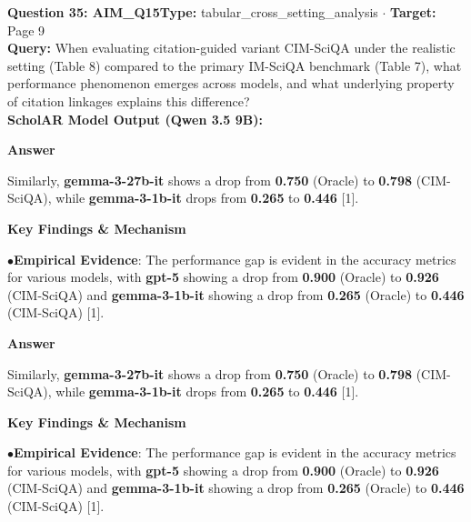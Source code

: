 \documentclass[10pt,a4paper]{article}
\begin{document}
\begin{tcolorbox}[questionbox]
{\noindent\bfseries\large\color{navy} Question 35: AIM\_Q15}\hfill {\footnotesize\color{darkteal}\textbf{Type:} tabular\_cross\_setting\_analysis $\cdot$ \textbf{Target:} Page 9}\\[4pt]
{\noindent\bfseries\color{accentblue} Query: } When evaluating citation-guided variant CIM-SciQA under the realistic setting (Table 8) compared to the primary IM-SciQA benchmark (Table 7), what performance phenomenon emerges across models, and what underlying property of citation linkages explains this difference?\\[6pt]
{\noindent\bfseries\color{navy} ScholAR Model Output (Qwen 3.5 9B):}\\[2pt]
{\small \noindent \textbf{Answer}\par\vspace{3pt}Similarly, \textbf{gemma-3-27b-it} shows a drop from \textbf{0.750} (Oracle) to \textbf{0.798} (CIM-SciQA), while \textbf{gemma-3-1b-it} drops from \textbf{0.265} to \textbf{0.446} [1].\par\vspace{3pt}\noindent \textbf{Key Findings \& Mechanism}\par\vspace{3pt}\noindent\hspace*{8pt}$\bullet$\hspace*{4pt}\textbf{Empirical Evidence}: The performance gap is evident in the accuracy metrics for various models, with \textbf{gpt-5} showing a drop from \textbf{0.900} (Oracle) to \textbf{0.926} (CIM-SciQA) and \textbf{gemma-3-1b-it} showing a drop from \textbf{0.265} (Oracle) to \textbf{0.446} (CIM-SciQA) [1].\par\vspace{3pt}\noindent \textbf{Answer}\par\vspace{3pt}Similarly, \textbf{gemma-3-27b-it} shows a drop from \textbf{0.750} (Oracle) to \textbf{0.798} (CIM-SciQA), while \textbf{gemma-3-1b-it} drops from \textbf{0.265} to \textbf{0.446} [1].\par\vspace{3pt}\noindent \textbf{Key Findings \& Mechanism}\par\vspace{3pt}\noindent\hspace*{8pt}$\bullet$\hspace*{4pt}\textbf{Empirical Evidence}: The performance gap is evident in the accuracy metrics for various models, with \textbf{gpt-5} showing a drop from \textbf{0.900} (Oracle) to \textbf{0.926} (CIM-SciQA) and \textbf{gemma-3-1b-it} showing a drop from \textbf{0.265} (Oracle) to \textbf{0.446} (CIM-SciQA) [1].}\\[6pt]

\end{tcolorbox}
\end{document}
